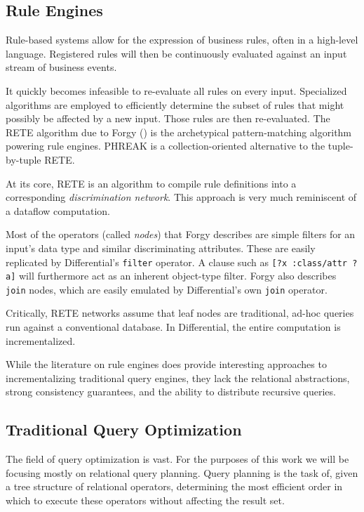 \documentclass[../index.tex]{subfiles}
\begin{document}
\subsection{Rule Engines}

Rule-based systems allow for the expression of business rules, often
in a high-level language. Registered rules will then be continuously
evaluated against an input stream of business events. 

It quickly becomes infeasible to re-evaluate all rules on every
input. Specialized algorithms are employed to efficiently determine
the subset of rules that might possibly be affected by a new
input. Those rules are then re-evaluated. The RETE algorithm due to
Forgy (\cite{forgy1989rete}) is the archetypical pattern-matching
algorithm powering rule engines. PHREAK \cite{drools} is a
collection-oriented alternative to the tuple-by-tuple RETE.

At its core, RETE is an algorithm to compile rule definitions into a
corresponding \emph{discrimination network}. This approach is very
much reminiscent of a dataflow computation.

Most of the operators (called \emph{nodes}) that Forgy describes are
simple filters for an input's data type and similar discriminating
attributes. These are easily replicated by Differential's
\texttt{filter} operator. A clause such as \texttt{[?x :class/attr
    ?a]} will furthermore act as an inherent object-type filter.
Forgy also describes \texttt{join} nodes, which are easily emulated by
Differential's own \texttt{join} operator.

Critically, RETE networks assume that leaf nodes are traditional,
ad-hoc queries run against a conventional database. In Differential,
the entire computation is incrementalized.

While the literature on rule engines does provide interesting
approaches to incrementalizing traditional query engines, they lack
the relational abstractions, strong consistency guarantees, and the
ability to distribute recursive queries.

\subsection{Traditional Query Optimization}

The field of query optimization is vast. For the purposes of this work
we will be focusing mostly on relational query planning. Query
planning is the task of, given a tree structure of relational
operators, determining the most efficient order in which to execute
these operators without affecting the result set.
\end{document}
